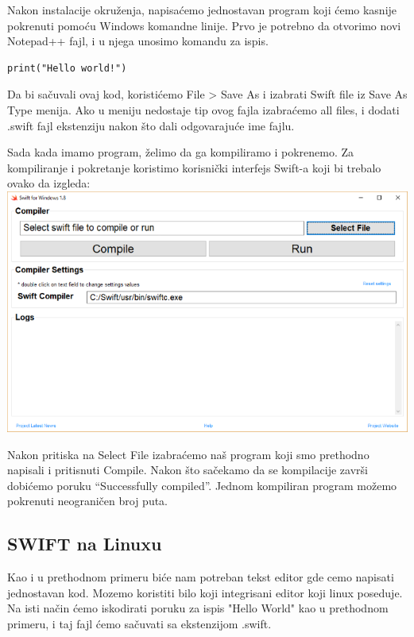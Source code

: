 \documentclass[a4paper]{article}
\begin{document}
Nakon instalacije okruženja, napisaćemo jednostavan program koji ćemo kasnije pokrenuti pomoću Windows komandne linije. Prvo je potrebno da otvorimo novi Notepad++ fajl, i u njega unosimo komandu za ispis.

\begin{lstlisting}[caption={},frame=single, label=simple]
print("Hello world!")
\end{lstlisting}
\vspace{3mm}
Da bi sačuvali ovaj kod, koristićemo File > Save As i izabrati Swift file iz Save As Type menija. Ako u meniju nedostaje tip ovog fajla izabraćemo all files, i dodati .swift fajl ekstenziju nakon što dali odgovarajuće ime fajlu.

Sada kada imamo program, želimo da ga kompiliramo i pokrenemo. Za kompiliranje i pokretanje koristimo korisnički interfejs Swift-a koji bi trebalo ovako da izgleda:\\

\includegraphics[scale=0.4]{swift-win.png}
\vspace{3mm}

Nakon pritiska na Select File izabraćemo naš program koji smo prethodno napisali i pritisnuti Compile. Nakon što sačekamo da se kompilacije završi dobićemo poruku “Successfully compiled”.
Jednom kompiliran program možemo pokrenuti neograničen broj puta.

\subsection{SWIFT na Linuxu}
\label{subsec:podnaslovLinux}

Kao i u prethodnom primeru biće nam potreban tekst editor gde cemo napisati jednostavan kod.
Mozemo koristiti bilo koji integrisani editor koji linux poseduje. Na isti način ćemo iskodirati poruku za ispis "Hello World" kao u prethodnom primeru, i taj fajl ćemo sačuvati sa ekstenzijom .swift.
\end{document}
